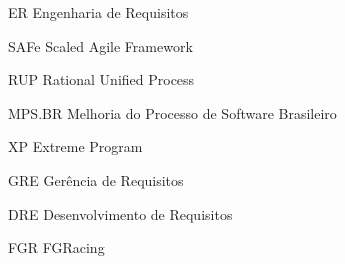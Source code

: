 \begin{siglas}
  \item[ER] Engenharia de Requisitos
  \item[SAFe] Scaled Agile Framework
  \item[RUP] Rational Unified Process
  \item[MPS.BR] Melhoria do Processo de Software Brasileiro
  \item[XP] Extreme Program
  \item[GRE] Gerência de Requisitos
  \item[DRE] Desenvolvimento de Requisitos
  \item[FGR] FGRacing
\end{siglas}
